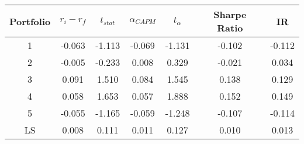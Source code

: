 \begin{tabular}{ccccccc}
\toprule
Portfolio & $r_i - r_f$ & $t_{stat}$ & $\alpha_{CAPM}$ & $t_{\alpha}$ & Sharpe Ratio & IR \\
\midrule
1 & -0.063 & -1.113 & -0.069 & -1.131 & -0.102 & -0.112 \\
2 & -0.005 & -0.233 & 0.008 & 0.329 & -0.021 & 0.034 \\
3 & 0.091 & 1.510 & 0.084 & 1.545 & 0.138 & 0.129 \\
4 & 0.058 & 1.653 & 0.057 & 1.888 & 0.152 & 0.149 \\
5 & -0.055 & -1.165 & -0.059 & -1.248 & -0.107 & -0.114 \\
LS & 0.008 & 0.111 & 0.011 & 0.127 & 0.010 & 0.013 \\
\bottomrule
\end{tabular}
